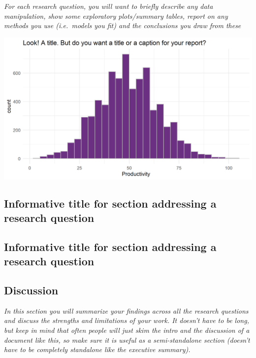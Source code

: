 \documentclass[
          english,
          paper=a4,
              ,captions=tableheading
  ]{scrartcl}
\begin{document}
\emph{For each research question, you will want to briefly describe any
data manipulation, show some exploratory plots/summary tables, report on
any methods you use (i.e.~models you fit) and the conclusions you draw
from these}

\includegraphics{images/example.png}

\hypertarget{informative-title-for-section-addressing-a-research-question-1}{%
\subsection{Informative title for section addressing a research
question}\label{informative-title-for-section-addressing-a-research-question-1}}

\hypertarget{informative-title-for-section-addressing-a-research-question-2}{%
\subsection{Informative title for section addressing a research
question}\label{informative-title-for-section-addressing-a-research-question-2}}

\hypertarget{discussion}{%
\subsection{Discussion}\label{discussion}}

\emph{In this section you will summarize your findings across all the
research questions and discuss the strengths and limitations of your
work. It doesn't have to be long, but keep in mind that often people
will just skim the intro and the discussion of a document like this, so
make sure it is useful as a semi-standalone section (doesn't have to be
completely standalone like the executive summary).}
\end{document}
